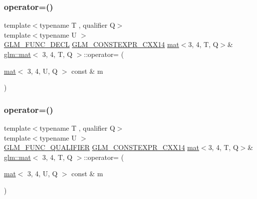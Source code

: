 \subsubsection{\texorpdfstring{operator=()}{operator=()}\hspace{0.1cm}{\footnotesize\ttfamily [2/3]}}
{\footnotesize\ttfamily template$<$typename T , qualifier Q$>$ \\
template$<$typename U $>$ \\
\hyperlink{setup_8hpp_ab2d052de21a70539923e9bcbf6e83a51}{G\+L\+M\+\_\+\+F\+U\+N\+C\+\_\+\+D\+E\+CL} \hyperlink{setup_8hpp_a4dd12abf5e1164bc57f3a34671d03844}{G\+L\+M\+\_\+\+C\+O\+N\+S\+T\+E\+X\+P\+R\+\_\+\+C\+X\+X14} \hyperlink{structglm_1_1mat}{mat}$<$3, 4, T, Q$>$\& \hyperlink{structglm_1_1mat}{glm\+::mat}$<$ 3, 4, T, Q $>$\+::operator= (\begin{DoxyParamCaption}\item[{\hyperlink{structglm_1_1mat}{mat}$<$ 3, 4, U, Q $>$ const \&}]{m }\end{DoxyParamCaption})}

\mbox{\label{structglm_1_1mat_3_013_00_014_00_01_t_00_01_q_01_4_aac8347d8c60d7b5eac67387ca84f39f6}} 
\subsubsection{\texorpdfstring{operator=()}{operator=()}\hspace{0.1cm}{\footnotesize\ttfamily [3/3]}}
{\footnotesize\ttfamily template$<$typename T , qualifier Q$>$ \\
template$<$typename U $>$ \\
\hyperlink{setup_8hpp_a33fdea6f91c5f834105f7415e2a64407}{G\+L\+M\+\_\+\+F\+U\+N\+C\+\_\+\+Q\+U\+A\+L\+I\+F\+I\+ER} \hyperlink{setup_8hpp_a4dd12abf5e1164bc57f3a34671d03844}{G\+L\+M\+\_\+\+C\+O\+N\+S\+T\+E\+X\+P\+R\+\_\+\+C\+X\+X14} \hyperlink{structglm_1_1mat}{mat}$<$3, 4, T, Q$>$\& \hyperlink{structglm_1_1mat}{glm\+::mat}$<$ 3, 4, T, Q $>$\+::operator= (\begin{DoxyParamCaption}\item[{\hyperlink{structglm_1_1mat}{mat}$<$ 3, 4, U, Q $>$ const \&}]{m }\end{DoxyParamCaption})}



